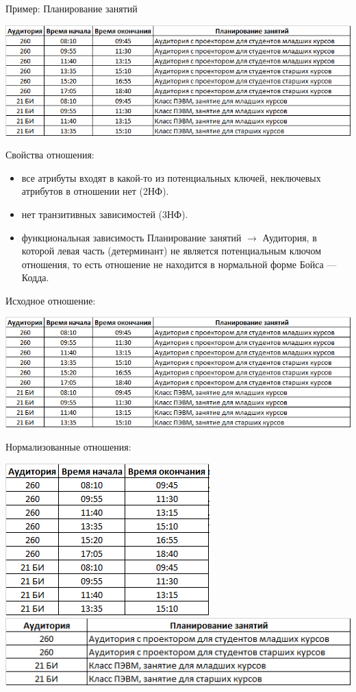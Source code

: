 \documentclass{beamer}
\begin{document}
\begin{frame}
Пример: Планирование занятий
\begin{center}
\includegraphics[scale=0.5]{images/ex-rasp-28.png}
\end{center}
Свойства отношения:
\begin{itemize}
\item все атрибуты входят в какой-то из потенциальных ключей, неключевых атрибутов в отношении нет (2НФ).
\item нет транзитивных зависимостей (3НФ).
\item функциональная зависимость Планирование занятий $\rightarrow$ Аудитория, в которой левая часть (детерминант) не является потенциальным ключом отношения, то есть отношение не находится в нормальной форме Бойса — Кодда.
\end{itemize}
\end{frame}

\begin{frame}
Исходное отношение:
\begin{center}
\includegraphics[scale=0.5]{images/ex-rasp-28.png}
\end{center}
Нормализованные отношения:
\begin{center}
\includegraphics[scale=0.5]{images/ex-rasp-29.png}
\includegraphics[scale=0.5]{images/ex-rasp-30.png}
\end{center}
\end{frame}
\end{document}
